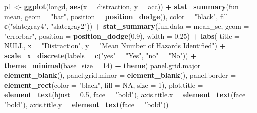 \documentclass[
]{book}
\newenvironment{Shaded}{\begin{snugshade}}{\end{snugshade}}
\newcommand{\AttributeTok}[1]{\textcolor[rgb]{0.13,0.29,0.53}{#1}}
\newcommand{\ConstantTok}[1]{\textcolor[rgb]{0.56,0.35,0.01}{#1}}
\newcommand{\DecValTok}[1]{\textcolor[rgb]{0.00,0.00,0.81}{#1}}
\newcommand{\FloatTok}[1]{\textcolor[rgb]{0.00,0.00,0.81}{#1}}
\newcommand{\FunctionTok}[1]{\textcolor[rgb]{0.13,0.29,0.53}{\textbf{#1}}}
\newcommand{\NormalTok}[1]{#1}
\newcommand{\OtherTok}[1]{\textcolor[rgb]{0.56,0.35,0.01}{#1}}
\newcommand{\SpecialCharTok}[1]{\textcolor[rgb]{0.81,0.36,0.00}{\textbf{#1}}}
\newcommand{\StringTok}[1]{\textcolor[rgb]{0.31,0.60,0.02}{#1}}
\begin{document}
\begin{Shaded}
\begin{Highlighting}[]
\NormalTok{p1 }\OtherTok{\textless{}{-}} \FunctionTok{ggplot}\NormalTok{(longd, }\FunctionTok{aes}\NormalTok{(}\AttributeTok{x =}\NormalTok{ distraction, }\AttributeTok{y =}\NormalTok{ acc)) }\SpecialCharTok{+}
  \FunctionTok{stat\_summary}\NormalTok{(}\AttributeTok{fun =}\NormalTok{ mean, }\AttributeTok{geom =} \StringTok{"bar"}\NormalTok{, }
               \AttributeTok{position =} \FunctionTok{position\_dodge}\NormalTok{(), }
               \AttributeTok{color =} \StringTok{"black"}\NormalTok{,}
               \AttributeTok{fill =} \FunctionTok{c}\NormalTok{(}\StringTok{"slategray4"}\NormalTok{, }\StringTok{"slategray2"}\NormalTok{)) }\SpecialCharTok{+}
  \FunctionTok{stat\_summary}\NormalTok{(}\AttributeTok{fun.data =}\NormalTok{ mean\_se, }\AttributeTok{geom =} \StringTok{"errorbar"}\NormalTok{, }
               \AttributeTok{position =} \FunctionTok{position\_dodge}\NormalTok{(}\FloatTok{0.9}\NormalTok{), }\AttributeTok{width =} \FloatTok{0.25}\NormalTok{) }\SpecialCharTok{+}
  \FunctionTok{labs}\NormalTok{(}
    \AttributeTok{title =} \ConstantTok{NULL}\NormalTok{,}
    \AttributeTok{x =} \StringTok{"Distraction"}\NormalTok{,}
    \AttributeTok{y =} \StringTok{"Mean Number of Hazards Identified"}\NormalTok{) }\SpecialCharTok{+}
  \FunctionTok{scale\_x\_discrete}\NormalTok{(}\AttributeTok{labels =} \FunctionTok{c}\NormalTok{(}\StringTok{"yes"} \OtherTok{=} \StringTok{"Yes"}\NormalTok{, }\StringTok{"no"} \OtherTok{=} \StringTok{"No"}\NormalTok{)) }\SpecialCharTok{+}
  \FunctionTok{theme\_minimal}\NormalTok{(}\AttributeTok{base\_size =} \DecValTok{14}\NormalTok{) }\SpecialCharTok{+}
  \FunctionTok{theme}\NormalTok{(}
    \AttributeTok{panel.grid.major =} \FunctionTok{element\_blank}\NormalTok{(),}
    \AttributeTok{panel.grid.minor =} \FunctionTok{element\_blank}\NormalTok{(),}
    \AttributeTok{panel.border =} \FunctionTok{element\_rect}\NormalTok{(}\AttributeTok{color =} \StringTok{"black"}\NormalTok{, }\AttributeTok{fill =} \ConstantTok{NA}\NormalTok{, }\AttributeTok{size =} \DecValTok{1}\NormalTok{),}
    \AttributeTok{plot.title =} \FunctionTok{element\_text}\NormalTok{(}\AttributeTok{hjust =} \FloatTok{0.5}\NormalTok{, }\AttributeTok{face =} \StringTok{"bold"}\NormalTok{),}
    \AttributeTok{axis.title.x =} \FunctionTok{element\_text}\NormalTok{(}\AttributeTok{face =} \StringTok{"bold"}\NormalTok{),}
    \AttributeTok{axis.title.y =} \FunctionTok{element\_text}\NormalTok{(}\AttributeTok{face =} \StringTok{"bold"}\NormalTok{))}
\end{Highlighting}
\end{Shaded}
\end{document}

